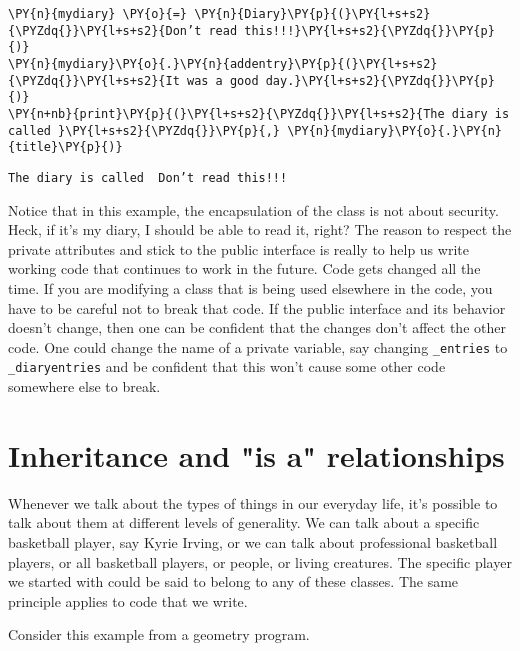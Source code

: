 \begin{Verbatim}[commandchars=\\\{\}]
\PY{n}{mydiary} \PY{o}{=} \PY{n}{Diary}\PY{p}{(}\PY{l+s+s2}{\PYZdq{}}\PY{l+s+s2}{Don’t read this!!!}\PY{l+s+s2}{\PYZdq{}}\PY{p}{)}
\PY{n}{mydiary}\PY{o}{.}\PY{n}{addentry}\PY{p}{(}\PY{l+s+s2}{\PYZdq{}}\PY{l+s+s2}{It was a good day.}\PY{l+s+s2}{\PYZdq{}}\PY{p}{)}
\PY{n+nb}{print}\PY{p}{(}\PY{l+s+s2}{\PYZdq{}}\PY{l+s+s2}{The diary is called }\PY{l+s+s2}{\PYZdq{}}\PY{p}{,} \PY{n}{mydiary}\PY{o}{.}\PY{n}{title}\PY{p}{)}
\end{Verbatim}

\begin{Verbatim}
The diary is called  Don’t read this!!!
\end{Verbatim}


Notice that in this example, the encapsulation of the class is not about security.  Heck, if it’s my diary, I should be able to read it, right?  The reason to respect the private attributes and stick to the public interface is really to help us write working code that continues to work in the future.  Code gets changed all the time.  If you are modifying a class that is being used elsewhere in the code, you have to be careful not to break that code.  If the public interface and its behavior doesn’t change, then one can be confident that the changes don’t affect the other code.  One could change the name of a private variable, say changing \texttt{\_entries} to \texttt{\_diaryentries} and be confident that this won’t cause some other code somewhere else to break.

\section{Inheritance and "is a" relationships}


Whenever we talk about the types of things in our everyday life, it’s possible to talk about them at different levels of generality.  We can talk about a specific basketball player, say Kyrie Irving, or we can talk about professional basketball players, or all basketball players, or people, or living creatures.  The specific player we started with could be said to belong to any of these classes.  The same principle applies to code that we write.  


Consider this example from a geometry program.


